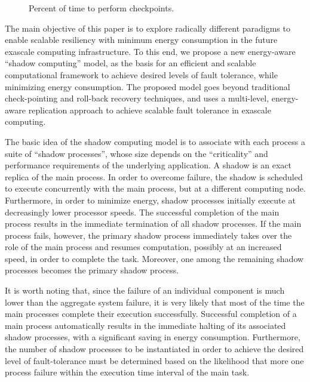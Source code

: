 \begin{figure}[hHtb]
\centering
{}
\caption { Percent of time to perform checkpoints. }
\label{sandia_checkpoint_time}
\end{figure}


The main objective of this paper is to explore radically different
paradigms to enable scalable resiliency with minimum energy
consumption in the future exascale computing infrastructure. To this
end, we propose a new energy-aware ``shadow computing'' model, as the
basis for an efficient and scalable computational framework to achieve
desired levels of fault tolerance, while minimizing energy
consumption. The proposed model goes beyond traditional check-pointing
and roll-back recovery techniques, and uses a multi-level,
energy-aware replication approach to achieve scalable fault tolerance
in exascale computing.

The basic idea of the shadow computing model is to associate with each
process a suite of ``shadow processes'', whose size depends on the
``criticality'' and performance requirements of the underlying
application. A shadow is an exact replica of the main process. In
order to overcome failure, the shadow is scheduled to execute
concurrently with the main process, but at a different computing
node. Furthermore, in order to minimize energy, shadow processes
initially execute at decreasingly lower processor speeds. The
successful completion of the main process results in the immediate
termination of all shadow processes. If the main process fails, however,
the primary shadow process immediately takes over the role of the main
process and resumes computation, possibly at an increased speed, in
order to complete the task. Moreover, one among the remaining shadow processes
becomes the primary shadow process.

It is worth noting that, since the failure of an individual component
is much lower than the aggregate system failure, it is very likely
that most of the time the main processes complete their execution
successfully. Successful completion of a main process automatically
results in the immediate halting of its associated shadow processes,
with a significant saving in energy consumption. Furthermore, the number
of shadow processes to be instantiated in order to achieve the desired level
of fault-tolerance must be determined based on the likelihood that
more one process failure within the execution time interval of the main
task.

